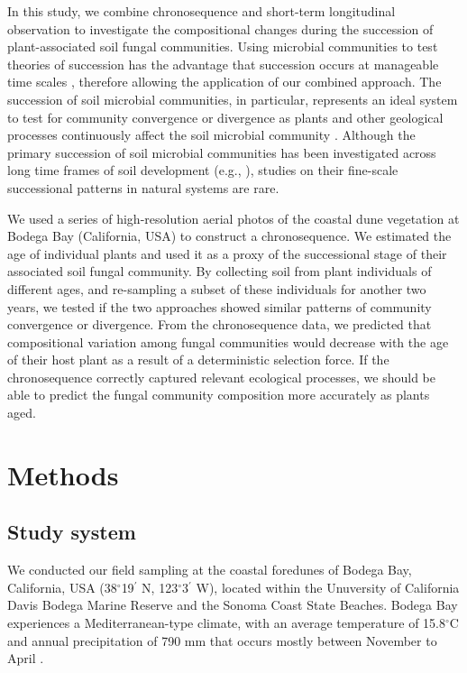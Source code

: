 In this study, we combine chronosequence and short-term longitudinal observation to investigate the compositional changes during the succession of plant-associated soil fungal communities.
Using microbial communities to test theories of succession has the advantage that succession occurs at manageable time scales \citep{Fierer2010, Chaparro2013, Gao2019}, therefore allowing the application of our combined approach.
The succession of soil microbial communities, in particular, represents an ideal system to test for community convergence or divergence as plants and other geological processes continuously affect the soil microbial community \citep{BrownJumpponen2014, Castle2016, Dinnage2019}. Although the primary succession of soil microbial communities has been investigated across long time frames of soil development (e.g., \citealp{BrownJumpponen2014, Castle2016}), studies on their fine-scale successional patterns in natural systems are rare. 
\par


We used a series of high-resolution aerial photos of the coastal dune vegetation at Bodega Bay (California, USA) to construct a chronosequence.
We estimated the age of individual plants and used it as a proxy of the successional stage of their associated soil fungal community. By collecting soil from plant individuals of different ages, and re-sampling a subset of these individuals for another two years, we tested if the two approaches showed similar patterns of community convergence or divergence. From the chronosequence data, we predicted that compositional variation among fungal communities would decrease with the age of their host plant as a result of a deterministic selection force. If the chronosequence correctly captured relevant ecological processes, we should be able to predict the fungal community composition more accurately as plants aged. 
\par



\section{Methods}
\subsection*{Study system}
We conducted our field sampling at the coastal foredunes of Bodega Bay, California, USA (38$^{\circ}$19$^\prime$ N, 123$^{\circ}$3$^\prime$ W), located within the Unuversity of California Davis Bodega Marine Reserve and the Sonoma Coast State Beaches. Bodega Bay experiences a Mediterranean-type climate, with an average temperature of 15.8$^{\circ}$C and annual precipitation of 790 mm that occurs mostly between November to April \citep{Conser2009}. 
\par


